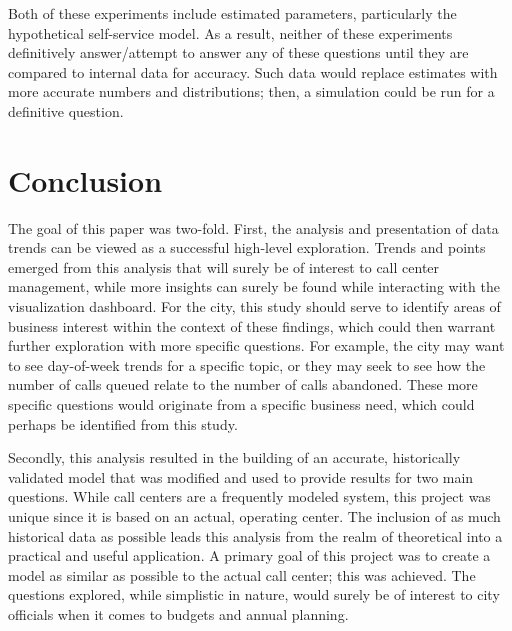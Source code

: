 \documentclass[12pt]{article}
\begin{document}
\par

Both of these experiments include estimated parameters, particularly the hypothetical self-service model.  As a result, neither of these experiments definitively answer/attempt to answer any of these questions until they are compared to internal data for accuracy.  Such data would replace estimates with more accurate numbers and distributions; then, a simulation could be run for a definitive question.









\section{Conclusion}

The goal of this paper was two-fold.  First, the analysis and presentation of data trends can be viewed as a successful high-level exploration.  Trends and points emerged from this analysis that will surely be of interest to call center management, while more insights can surely be found while interacting with the visualization dashboard.  For the city, this study should serve to identify areas of business interest within the context of these findings, which could then warrant further exploration with more specific questions.  For example, the city may want to see day-of-week trends for a specific topic, or they may seek to see how the number of calls queued relate to the number of calls abandoned.  These more specific questions would originate from a specific business need, which could perhaps be identified from this study.

\par

Secondly, this analysis resulted in the building of an accurate, historically validated model that was modified and used to provide results for two main questions.  While call centers are a frequently modeled system, this project was unique since it is based on an actual, operating center.  The inclusion of as much historical data as possible leads this analysis from the realm of theoretical into a practical and useful application.  A primary goal of this project was to create a model as similar as possible to the actual call center; this was achieved.  The questions explored, while simplistic in nature, would surely be of interest to city officials when it comes to budgets and annual planning.
\end{document}
